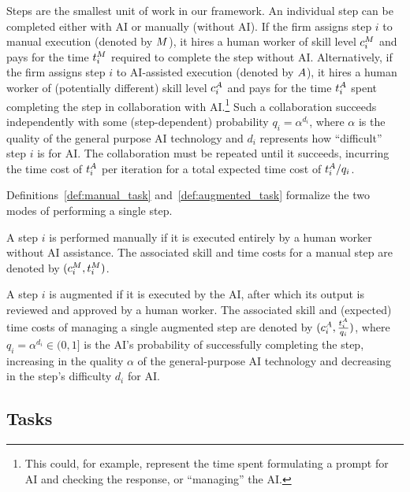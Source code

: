 Steps are the smallest unit of work in our framework.
An individual step can be completed either with AI or manually (without AI).
If the firm assigns step $i$ to manual execution (denoted by $M$), it hires a human worker of skill level $c^{M}_{i}$ and pays for the time $t^{M}_{i}$ required to complete the step without AI.
Alternatively, if the firm assigns step $i$ to AI-assisted execution (denoted by $A$), it hires a human worker of (potentially different) skill level $c^{A}_{i}$ and pays for the time $t^{A}_{i}$ spent completing the step in collaboration with AI.\footnote{
This could, for example, represent the time spent formulating a prompt for AI and checking the response, or ``managing'' the AI.
}
Such a collaboration succeeds independently with some (step-dependent) probability $q_i=\alpha^{d_i}$, where $\alpha$ is the quality of the general purpose AI technology and $d_i$ represents how ``difficult'' step $i$ is for AI.
The collaboration must be repeated until it succeeds, incurring the time cost of $t^{A}_{i}$ per iteration for a total expected time cost of $t^{A}_{i}/q_i$.

Definitions~\ref{def:manual_task} and~\ref{def:augmented_task} formalize the two modes of performing a single step.

\begin{definition}
\label{def:manual_task}
A step $i$ is performed manually if it is executed entirely by a human worker without AI assistance.
The associated skill and time costs for a manual step are denoted by $(c^{M}_{i}, t^{M}_{i})$.
\end{definition}

\begin{definition}
\label{def:augmented_task}
A step $i$ is augmented if it is executed by the AI, after which its output is reviewed and approved by a human worker.
The associated skill and (expected) time costs of managing a single augmented step are denoted by $(c^{A}_{i}, \frac{t^{A}_{i}}{q_i})$, where $q_i = \alpha^{d_i} \in (0,1]$ is the AI's probability of successfully completing the step, increasing in the quality $\alpha$ of the general-purpose AI technology and decreasing in the step's difficulty $d_i$ for AI.
\end{definition}



\subsection{Tasks}
\label{sec:model.tasks}

